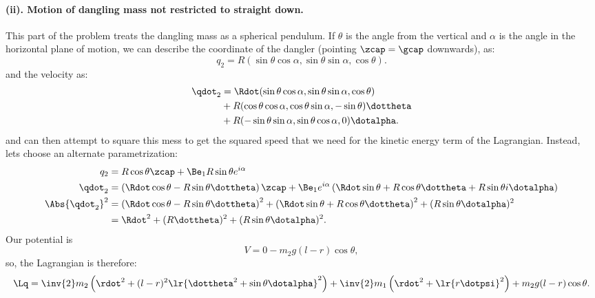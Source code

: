 {\paragraph{(ii).  Motion of dangling mass not restricted to straight down.}
%
This part of the problem treats the dangling mass as a spherical pendulum.  If \(\theta\) is the angle from the vertical
and \(\alpha\) is the angle in the horizontal plane of motion, we can describe the coordinate of the dangler
(pointing \(\zcap = \gcap\) downwards), as:
%
\begin{equation}\label{eqn:tongMf1:2360}
q_2 = R( \sin\theta \cos\alpha, \sin\theta \sin\alpha, \cos\theta ).
\end{equation}
%
and the velocity as:
\begin{equation}\label{eqn:tongMf1:920}
\begin{aligned}
\qdot_2
&= \Rdot( \sin\theta \cos\alpha, \sin\theta \sin\alpha, \cos\theta ) \\
&+ R( \cos\theta \cos\alpha, \cos\theta \sin\alpha, -\sin\theta ) \dottheta \\
&+ R ( -\sin\theta \sin\alpha, \sin\theta \cos\alpha, 0) \dotalpha .
\end{aligned}
\end{equation}
%
and can then attempt to square this mess to get the squared speed that we need for the kinetic energy term of the Lagrangian.  Instead, lets choose an alternate parametrization:
%
\begin{equation}\label{eqn:tongMf1:940}
\begin{aligned}
q_2 &= R \cos\theta \zcap + \Be_1 R \sin\theta e^{i\alpha} \\
\qdot_2
&= \left(\Rdot \cos\theta - R \sin\theta \dottheta\right) \zcap
+ \Be_1 e^{i\alpha} \left( \Rdot \sin\theta + R \cos\theta \dottheta + R \sin\theta i \dotalpha \right) \\
\Abs{\qdot_2}^2
&= \left(\Rdot \cos\theta - R \sin\theta \dottheta\right)^2
+ \left( \Rdot \sin\theta + R \cos\theta \dottheta\right)^2
+ (R \sin\theta \dotalpha)^2 \\
&= \Rdot^2 + (R \dottheta)^2 + (R \sin\theta \dotalpha)^2 .
\end{aligned}
\end{equation}
%
Our potential is
%
\begin{equation}\label{eqn:tongMf1:2380}
V = 0 - m_2 g (l-r) \cos\theta,
\end{equation}
%
so, the Lagrangian is therefore:
%
\begin{equation}\label{eqn:tongMf1:960}
\Lq = \inv{2} m_2 \left(\rdot^2 +
(l-r)^2
\lr{ \dottheta^2 + \sin\theta \dotalpha }^2
 \right) + \inv{2} m_1 \left(\rdot^2 +
\lr{ r\dotpsi }^2
\right) + m_2 g
(l-r) \cos\theta.
\end{equation}
}

